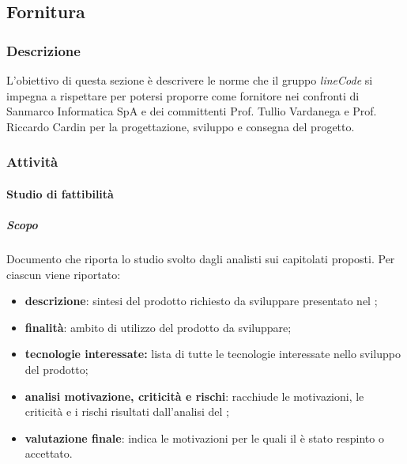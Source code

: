 \subsection{Fornitura}

	\subsubsection{Descrizione}
	L'obiettivo di questa sezione è descrivere le norme che il gruppo \textit{lineCode} si impegna a rispettare per potersi proporre come fornitore nei confronti di Sanmarco Informatica SpA e dei committenti Prof. Tullio Vardanega e Prof. Riccardo Cardin per la progettazione, sviluppo e consegna del progetto.

	\subsubsection{Attività}
		\paragraph{Studio di fattibilità}
            \subparagraph{Scopo}
    		Documento che riporta lo studio svolto dagli analisti sui capitolati proposti. Per ciascun  viene riportato:
    		\begin{itemize}
    			\item \textbf{descrizione}: sintesi del prodotto richiesto da sviluppare presentato nel ;
    		 	\item \textbf{finalità}: ambito di utilizzo del prodotto da sviluppare;
    		 	\item \textbf{tecnologie interessate:} lista di tutte le tecnologie interessate nello sviluppo del prodotto;
    		 	\item \textbf{analisi motivazione, criticità e rischi}: racchiude le motivazioni, le criticità e i rischi risultati dall'analisi del ;
    		 	\item \textbf{valutazione finale}: indica le motivazioni per le quali il  è stato respinto o accettato.
    		\end{itemize}

